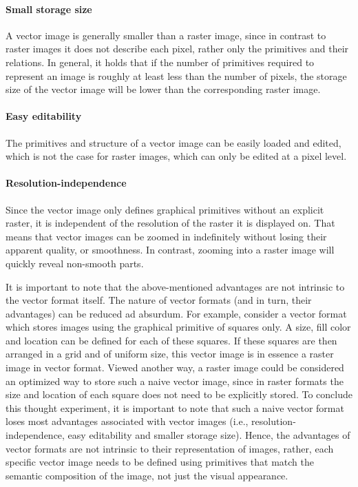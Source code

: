 \paragraph{Small storage size} A vector image is generally smaller than a raster image, since in contrast to raster images it does not describe each pixel, rather only the primitives and their relations. In general, it holds that if the number of primitives required to represent an image is roughly at least less than the number of pixels, the storage size of the vector image will be lower than the corresponding raster image.

\paragraph{Easy editability} The primitives and structure of a vector image can be easily loaded and edited, which is not the case for raster images, which can only be edited at a pixel level.

\paragraph{Resolution-independence} Since the vector image only defines graphical primitives without an explicit raster, it is independent of the resolution of the raster it is displayed on. That means that vector images can be zoomed in indefinitely without losing their apparent quality, or smoothness. In contrast, zooming into a raster image will quickly reveal non-smooth parts.

It is important to note that the above-mentioned advantages are not intrinsic to the vector format itself. The nature of vector formats (and in turn, their advantages) can be reduced ad absurdum. For example, consider a vector format which stores images using the graphical primitive of squares only. A size, fill color and location can be defined for each of these squares. If these squares are then arranged in a grid and of uniform size, this vector image is in essence a raster image in vector format. Viewed another way, a raster image could be considered an optimized way to store such a naive vector image, since in raster formats the size and location of each square does not need to be explicitly stored. To conclude this thought experiment, it is important to note that such a naive vector format loses most advantages associated with vector images (i.e., resolution-independence, easy editability and smaller storage size). Hence, the advantages of vector formats are not intrinsic to their representation of images, rather, each specific vector image needs to be defined using primitives that match the semantic composition of the image, not just the visual appearance.

